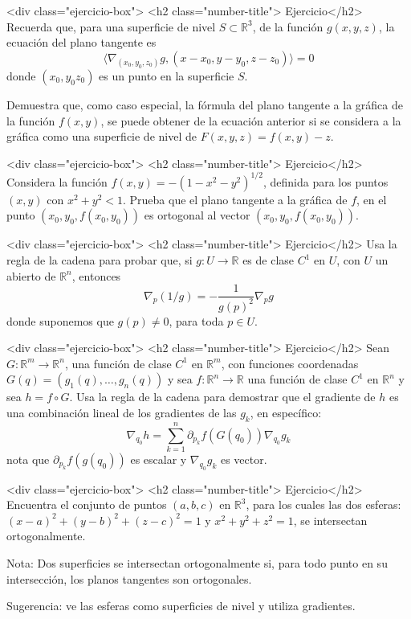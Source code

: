 \documentclass{article}
\theoremstyle{definition}
\begin{document}
  <div class="ejercicio-box"> <h2 class="number-title"> Ejercicio</h2> Recuerda que, para una superficie de nivel $S \subset \mathbb{R}^3$, de la función $g(x,y,z)$,
    la ecuación del plano tangente es
    $$
    \langle \nabla_{(x_0,y_0,z_0)}g, (x-x_0,y-y_0,z-z_0) \rangle =0
    $$
    donde $(x_0,y_0z_0)$ es un punto en la superficie $S$.

    Demuestra que, como caso especial, la fórmula del plano tangente a la gráfica de la función
    $f(x,y)$, se puede obtener de la ecuación anterior si se considera a la gráfica
    como una superficie de nivel de $F(x,y,z)=f(x,y)-z$.
 
    
  <div class="ejercicio-box"> <h2 class="number-title"> Ejercicio</h2> Considera la función $f(x,y)=-(1-x^2-y^2)^{1/2}$, definida para los puntos $(x,y)$
    con $x^2+y^2<1$. Prueba que el plano tangente a la gráfica de $f$, en el punto $(x_0,y_0,f(x_0,y_0))$
    es ortogonal al vector $(x_0,y_0,f(x_0,y_0))$.

    <div class="ejercicio-box"> <h2 class="number-title"> Ejercicio</h2> Usa la regla de la cadena para probar que, si $g:U\to \mathbb{R}$ es de clase
      $C^1$ en $U$, con $U$ un abierto de $\mathbb{R}^n$, entonces
      $$
      \nabla_{p}(1/g)=-\frac{1}{g(p)^2}\nabla_p g
      $$    
      donde suponemos que $g(p)\ne 0$, para toda $p\in U$.
    
  <div class="ejercicio-box"> <h2 class="number-title"> Ejercicio</h2> Sean $G:\mathbb{R}^m \to \mathbb{R}^n$, una función de clase $C^1$ en $\mathbb{R}^m$, con funciones
    coordenadas $G(q)=(g_1(q),\dots, g_n(q))$ y sea $f:\mathbb{R}^n \to \mathbb{R}$ una función
    de clase $C^1$ en $\mathbb{R}^n$ y sea $h=f\circ G$. Usa la regla de la cadena para demostrar que
    el gradiente de $h$ es una combinación lineal de los gradientes de las $g_k$, en específico:
    $$
    \nabla_{q_0} h= \sum_{k=1}^n \partial_{p_k}f(G(q_0)) \nabla_{q_0}g_k
    $$
    nota que $\partial_{p_k}f(g(q_0))$ es escalar y $\nabla_{q_0}g_k$ es vector.


    <div class="ejercicio-box"> <h2 class="number-title"> Ejercicio</h2> Encuentra el conjunto de puntos $(a,b,c)$ en $\mathbb{R}^3$, para los cuales las
      dos esferas: $(x-a)^2+(y-b)^2+(z-c)^2=1$ y $x^2+y^2+z^2=1$, se intersectan ortogonalmente.

      Nota: Dos superficies se intersectan ortogonalmente si, para todo punto en su intersección,
      los planos tangentes son ortogonales. 

      Sugerencia: ve las esferas como superficies de nivel y utiliza gradientes. 
\end{document}
